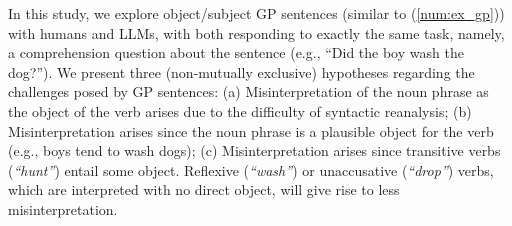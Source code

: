 

\def\thickhline{\noalign{\hrule height.8pt}}

In this study, we explore object/subject GP sentences (similar to (\ref{num:ex_gp})) with humans and LLMs, with both responding to exactly the same task, namely, a comprehension question about the sentence (e.g., ``Did the boy wash the dog?'').
We present three (non-mutually exclusive) hypotheses regarding the challenges posed by GP sentences: (a) Misinterpretation of the noun phrase as the object of the verb arises due to the difficulty of syntactic reanalysis; (b) Misinterpretation arises since the noun phrase is a plausible object for the verb (e.g., boys tend to wash dogs); (c) Misinterpretation arises since transitive verbs (\emph{``hunt''}) entail some object. Reflexive (\emph{``wash''}) or unaccusative (\emph{``drop''}) verbs, which are interpreted with no direct object, will give rise to less misinterpretation.



